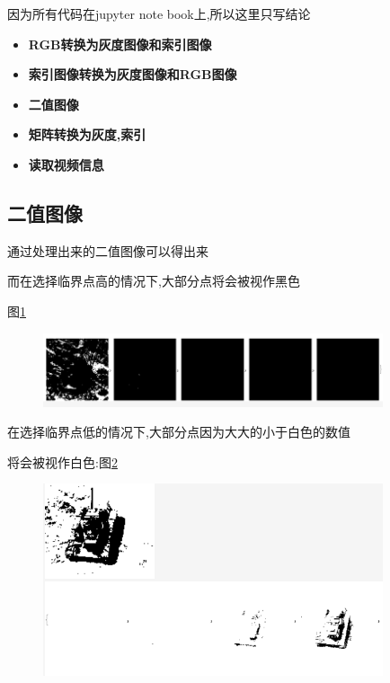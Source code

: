 \documentclass[a4paper]{article}
\begin{document}
因为所有代码在jupyter note book上,所以这里只写结论

\begin{itemize}
	\item{\textbf{RGB转换为灰度图像和索引图像}}
    \item{\textbf{索引图像转换为灰度图像和RGB图像}}
    \item{\textbf{二值图像}}
    \item{\textbf{矩阵转换为灰度,索引}}
    \item{\textbf{读取视频信息}}
\end{itemize}

\newpage

\subsection{二值图像}

通过处理出来的二值图像可以得出来

而在选择临界点高的情况下,大部分点将会被视作黑色

图\ref{fig:over-black}

\begin{figure}[ht]
    \centering
    \includegraphics[width=10cm]{over-black.png}
    \label{fig:over-black}
\end{figure}

在选择临界点低的情况下,大部分点因为大大的小于白色的数值

将会被视作白色:图\ref{fig:over-white}

\begin{figure}[ht]
    \centering
    \includegraphics[width=10cm]{over-white.png}
    \label{fig:over-white}
\end{figure}

\end{document}
